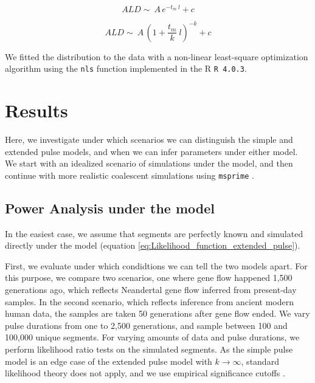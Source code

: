 \documentclass[11pt]{article}
\begin{document}
\begin{equation}
\label{eq:simple_pulse_tail_inf}
ALD \sim\ A\,e^{-t_m \:l}+c
\end{equation}

\begin{equation}
\label{eq:extended_pulse_tail_inf}
ALD \sim\ A\,\left( 1 + \frac{t_m}{k} \:l\right) ^{-k}+c
\end{equation}

We fitted the distribution to the data with a non-linear least-square optimization algorithm using the \texttt{nls} function implemented in the R \texttt{R 4.0.3}. 

\section{Results}\label{results}


Here, we investigate under which scenarios we can distinguish the simple and extended pulse models, and when we can infer parameters under either model. 
We start with an idealized scenario of simulations under the model, and then continue with more realistic coalescent simulations using \texttt{msprime} \citep{kelleher_efficient_2016}. 

\subsection{Power Analysis under the model}\label{Power Analysis}
In the easiest case, we assume that segments are perfectly known and simulated directly under the model (equation \ref{eq:Likelihood_function_extended_pulse}).

First, we evaluate under which condidtions we can tell the two models apart. For this purpose, we compare two scenarios, one where gene flow happened 1,500 generations ago, which reflects Neandertal gene flow inferred from present-day samples. In the second scenario, which reflects inference from ancient modern human data, the samples are taken 50 generations after gene flow ended. We vary pulse durations from one to 2,500 generations, and sample between 100 and 100,000 unique segments. For varying amounts of data and pulse durations, we perform likelihood ratio tests on the simulated segments. As the simple pulse model is an edge case of the extended pulse model with $k\to \infty$, standard likelihood theory does not apply, and we use empirical significance cutoffs \citep{Kozubowski_Testing_2008}.
\end{document}
